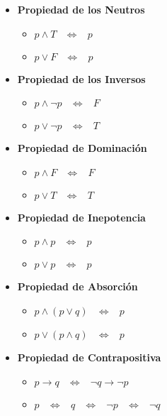 \documentclass[12pt, fleqn]{report}                             %
\DeclareMathOperator \Space     {\quad}                         %
\DeclareMathOperator \MiniSpace {\;}                            %
\theoremstyle{break}                                            %
\newcommand \lEqual  {\MiniSpace \Leftrightarrow \MiniSpace}    %
\begin{document}
\begin{itemize}
                    \clearpage

                    \item \textbf{Propiedad de los Neutros}
                        \begin{itemize}
                            \item $p \land T \lEqual p$
                            \item $p \lor F \lEqual p$
                        \end{itemize}

                    \item \textbf{Propiedad de los Inversos}
                        \begin{itemize}
                            \item $p \land \lnot p \lEqual F$
                            \item $p \lor \lnot p \lEqual T$
                        \end{itemize}

                    \item \textbf{Propiedad de Dominación}
                        \begin{itemize}
                            \item $p \land F \lEqual F$
                            \item $p \lor T \lEqual T$
                        \end{itemize}

                    \item \textbf{Propiedad de Inepotencia}
                        \begin{itemize}
                            \item $p \land p \lEqual p$
                            \item $p \lor p \lEqual p$
                        \end{itemize}

                    \item \textbf{Propiedad de Absorción}
                        \begin{itemize}
                            \item $p \land (p \lor q) \lEqual p$
                            \item $p \lor (p \land q) \lEqual p$
                        \end{itemize}

                    \item \textbf{Propiedad de Contrapositiva}
                        \begin{itemize}
                            \item $p \to q \lEqual \lnot q \to \lnot p$
                            \item $p \lEqual q  \lEqual \lnot p \lEqual \lnot q$
                        \end{itemize}

                \end{itemize}
\end{document}
